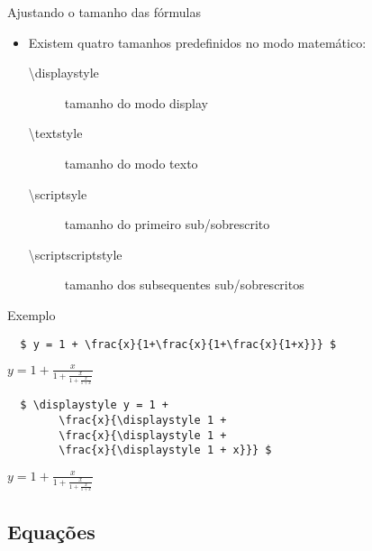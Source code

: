 \begin{frame}{Ajustando o tamanho das fórmulas}
    \begin{itemize}
    \item Existem quatro tamanhos predefinidos no modo matemático:
        \begin{description}
        \item[\textbackslash displaystyle] tamanho do modo display
        \item[\textbackslash textstyle] tamanho do modo texto
        \item[\textbackslash scriptsyle] tamanho do primeiro sub/sobrescrito
        \item[\textbackslash scriptscriptstyle] tamanho dos subsequentes sub/sobrescritos
        \end{description}
    \end{itemize}

    \begin{exampleblock}{Exemplo}
\begin{verbatim}
  $ y = 1 + \frac{x}{1+\frac{x}{1+\frac{x}{1+x}}} $
\end{verbatim}

    $ y = 1 + \frac{x}{1+\frac{x}{1+\frac{x}{1+x}}} $

\begin{verbatim}
  $ \displaystyle y = 1 +
        \frac{x}{\displaystyle 1 + 
        \frac{x}{\displaystyle 1 + 
        \frac{x}{\displaystyle 1 + x}}} $
\end{verbatim}

    $ \displaystyle y = 1 + 
        \frac{x}{\displaystyle 1 + 
        \frac{x}{\displaystyle 1 + 
        \frac{x}{\displaystyle 1 + x}}} $
    \end{exampleblock}
\end{frame}

\subsection{Equações}

